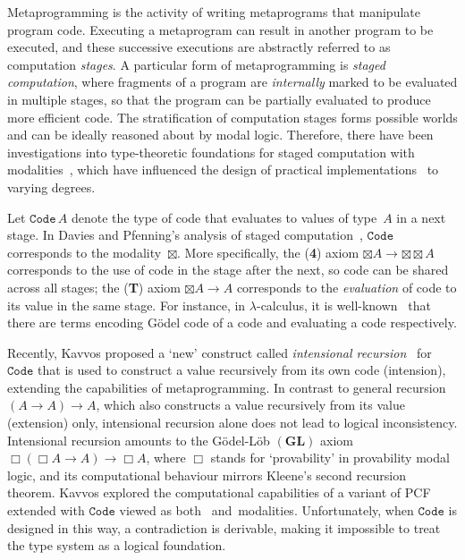 \documentclass[a4paper,UKenglish,numberwithinsect,cleveref,thm-restate]{lipics-v2021}
\numberwithin{equation}{section}
\theoremstyle{definition}
\theoremstyle{plain}
\begin{document}
Metaprogramming is the activity of writing metaprograms that manipulate program code.
Executing a metaprogram can result in another program to be executed, and these successive executions are abstractly referred to as computation \emph{stages}.
A particular form of metaprogramming is \emph{staged computation}, where fragments of a program are \emph{internally} marked to be evaluated in multiple stages, so that the program can be partially evaluated to produce more efficient code.
The stratification of computation stages forms possible worlds and can be ideally reasoned about by modal logic.
Therefore, there have been investigations into type-theoretic foundations for staged computation with modalities~\cite{Davies2017,Davies2001b,Kavvos2017a,Nanevski2008}, which have influenced the design of practical implementations~\cite{Kiselyov2014,Sheard2002,Taha2000} to varying degrees.

Let $\mathtt{Code}\,A$ denote the type of code that evaluates to values of type~$A$ in a next stage.
In Davies and Pfenning's analysis of staged computation~\cite{Davies2001b}, $\mathtt{Code}$ corresponds to the \SFour modality~$\boxtimes$.
More specifically, the (\textbf{4}) axiom $\boxtimes A \to {\boxtimes} {\boxtimes} A$ corresponds to the use of code in the stage after the next, so code can be shared across all stages;
the (\textbf{T}) axiom $\boxtimes A \to A$ corresponds to the \emph{evaluation} of code to its value in the same stage.
For instance, in $\lambda$-calculus, it is well-known~\cite{Barendregt1984a} that there are terms encoding Gödel code of a code and evaluating a code respectively.

Recently, Kavvos proposed a `new' construct called \emph{intensional recursion}~\cite{Kavvos2017a} for $\mathtt{Code}$ that is used to construct a value recursively from its own code (intension), extending the capabilities of metaprogramming.
In contrast to general recursion $(A \to A) \to A$, which also constructs a value recursively from its value (extension) only, intensional recursion alone does not lead to logical inconsistency.
Intensional recursion amounts to the Gödel-Löb $(\mathbf{GL})$ axiom $\Box (\Box A \to A) \to \Box A$, where $\Box$ stands for `provability' in provability modal logic, and its computational behaviour mirrors Kleene's second recursion theorem.
Kavvos explored the computational capabilities of a variant of PCF extended with $\mathtt{Code}$ viewed as both \SFour~and~\GL modalities.
Unfortunately, when $\mathtt{Code}$ is designed in this way, a contradiction is derivable, making it impossible to treat the type system as a logical foundation.
\end{document}
